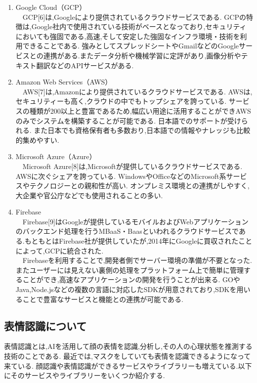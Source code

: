 \begin{enumerate}
  \item Google Cloud（GCP） \\
  　GCP[6]は,Googleにより提供されているクラウドサービスである.
  GCPの特徴は,Google社内で使用されている技術がベースとなっており,セキュリティにおいても強固である,高速,そして安定した強固なインフラ環境・技術を利用できることである.
  強みとしてスプレッドシートやGmailなどのGoogleサービスとの連携がある.またデータ分析や機械学習に定評があり,画像分析やテキスト翻訳などのAPIサービスがある.\\

  \item Amazon Web Services（AWS） \\
  　AWS[7]は,Amazonにより提供されているクラウドサービスである.
  AWSは,セキュリティーも高く,クラウドの中でもトップシェアを誇っている.
  サービスの種類が200以上と豊富であるため,幅広い用途に活用することができAWSのみでシステムを構築することが可能である.
  日本語でのサポートが受けられる.
  また日本でも資格保有者も多数おり,日本語での情報やナレッジも比較的集めやすい.
  \\

  \item Microsoft Azure（Azure） \\
  　Microsoft Azure[8]は,Microsoftが提供しているクラウドサービスである.
  AWSに次ぐシェアを誇っている.
  WindowsやOfficeなどのMicrosoft系サービスやテクノロジーとの親和性が高い.
  オンプレミス環境との連携がしやすく,大企業や官公庁などでも使用されることの多い.\\

  \item  Firebase \\
  　Firebase[9]はGoogleが提供しているモバイルおよびWebアプリケーションのバックエンド処理を行うMBaaS・Baasといわれるクラウドサービスである.もともとはFirebase社が提供していたが,2014年にGoogleに買収されたことによって,GCPに統合された.\\
  　Firebaseを利用することで,開発者側でサーバー環境の準備が不要となった.またユーザーには見えない裏側の処理をプラットフォーム上で簡単に管理することができ,高速なアプリケーションの開発を行うことが出来る.
  GOやJava,Node.jsなどの複数の言語に対応したSDKが用意されており,SDKを用いることで豊富なサービスと機能との連携が可能である.
  
\end{enumerate}

\subsection{表情認識について}
表情認識とは,AIを活用して顔の表情を認識,分析し,その人の心理状態を推測する技術のことである.
最近では,マスクをしていても表情を認識できるようになって来ている.
顔認識や表情認識ができるサービスやライブラリーも増えている.以下にそのサービスやライブラリーをいくつか紹介する.

